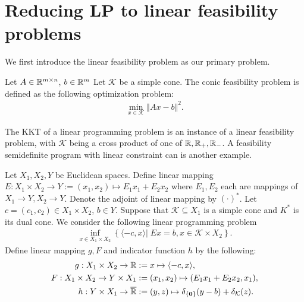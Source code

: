 \documentclass[12pt]{report}
\begin{document}
    \section{Reducing LP to linear feasibility problems}
        We first introduce the linear feasibility problem as our primary problem. 
        \begin{definition}
            Let $A\in \mathbb R^{m\times n}$, $b \in \mathbb R^m$
            Let $\mathcal K$ be a simple cone. 
            The conic feasibility problem is defined as the following optimization problem: 
            \begin{align*}
                \min_{x \in \mathcal K} \Vert Ax - b\Vert^2.
            \end{align*}
        \end{definition}
        The KKT of a linear programming problem is an instance of a linear feasibility problem, with $\mathcal K$ being a cross product of one of $\mathbb R, \mathbb R_+, \mathbb R_-$. 
        A feasibility semidefinite program with linear constraint can is another example. 
        \par
        Let $X_1, X_2, Y$ be Euclidean spaces. 
        Define linear mapping $E:X_1 \times X_2 \rightarrow Y := (x_1, x_2)\mapsto E_1 x_1 + E_2 x_2$ where $E_1, E_2$ each are mappings of $X_1 \rightarrow Y, X_2 \rightarrow Y$. 
        Denote the adjoint of linear mapping by $(\cdot)^*$. 
        Let $c = (c_1, c_2) \in X_1 \times X_2$, $b \in Y$. 
        Suppose that $\mathcal K \subseteq X_1$ is a simple cone and $K^*$ is its dual cone. 
        We consider the following linear programming problem 
        \begin{align}\label{problem:lp-cannon-form}
            \inf_{x \in X_1\times X_2}\left\lbrace
                \langle - c, x\rangle
                \left| \;
                    Ex = b, x \in \mathcal K \times X_2
                \right.
            \right\rbrace. 
        \end{align}
        Define linear mapping $g, F$ and indicator function $h$ by the following: 
        \begin{align*}
            g:X_1\times X_2 \rightarrow \mathbb R 
                &:= x \mapsto \langle - c, x\rangle, 
            \\
            F: X_1\times X_2 \rightarrow Y \times X_1 
                &:= (x_1, x_2) \mapsto (E_1x_1 + E_2 x_2, x_1),
            \\
            h: Y \times X_1 \rightarrow \overline {\mathbb R} &:= 
                (y, z) \mapsto \delta_{\{\mathbf 0\}}(y - b) + \delta_{\mathcal K}(z). 
        \end{align*}
\end{document}
